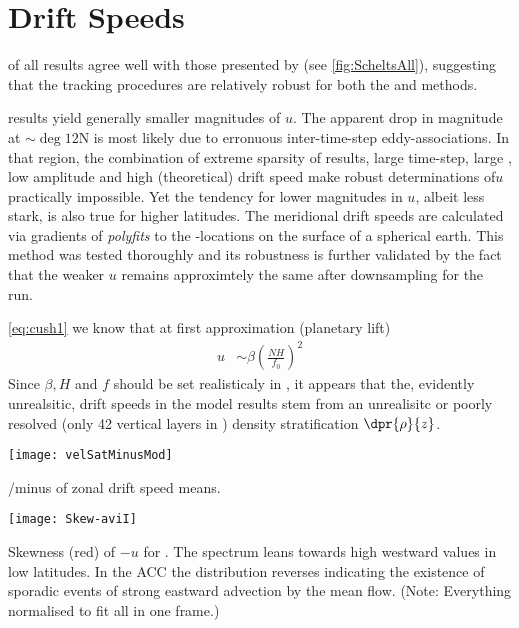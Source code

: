 \section{Drift Speeds}

 of all \AVI results agree well with those presented by \citet{Chelton2011} (see \cref{fig:ScheltsAll}), suggesting that the tracking procedures are relatively robust for both the \MI and \MII methods.

 \popSevenII results yield generally smaller magnitudes of $u$.
The apparent drop in magnitude at $\sim\deg{12}$N is most likely due to erronuous inter-time-step eddy-associations. In that region, the combination of extreme sparsity of results, large time-step, large \scale, low amplitude and high (theoretical) drift speed make robust determinations of$u$ practically impossible.
Yet the tendency for lower magnitudes in $u$, albeit less stark, is also true for higher latitudes.
The meridional drift speeds are calculated via gradients of \textit{polyfits} to the \CoV-locations on the surface of a spherical earth. This method was tested thoroughly and its robustness is further validated by the fact that the weaker $u$ remains approximtely the same after downsampling for the \pToaII run.

 \eqref{eq:cush1} we know that at first approximation (planetary lift)
\begin{align}
u
&\sim
\beta \left( 	\frac{NH}{f_{0}}  \right)^{2}
\end{align}
Since $\beta, H$ and $f$ should be set realisticaly in \POP, it appears that the, evidently unrealsitic, drift speeds in the model results stem from an unrealisitc or poorly resolved (only 42 vertical layers in \POP) density stratification $\dpr{\rho}{z}$.

\begin{marginfigure}
	\texttt{[image: velSatMinusMod]}
	\caption{\scriptsize{\aviI/\aviII minus \popSevenII of zonal drift speed means.}}
	\label{fig:velSatMinusMod}
\end{marginfigure}
\begin{marginfigure}
		\texttt{[image: Skew-aviI]}
		\caption{\scriptsize{Skewness (red) of $-u$ for \aviI. The spectrum leans towards high westward values in low latitudes. In the ACC the distribution reverses indicating the existence of sporadic events of strong eastward advection by the mean flow. (Note: Everything normalised to fit all in one frame.)}}
		\label{fig:SkewAviI}
\end{marginfigure}
